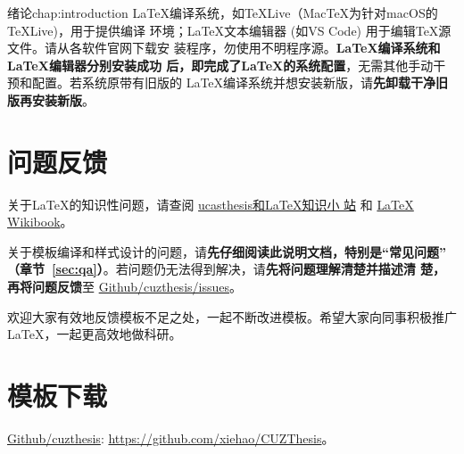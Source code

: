 \begin{cuzchapter}{绪论}{chap:introduction}
\LaTeX{}编译系统，如\TeX{}Live（Mac\TeX{}为针对macOS的\TeX{}Live)，用于提供编译
环境；\LaTeX{}文本编辑器 (如VS Code) 用于编辑\TeX{}源文件。请从各软件官网下载安
装程序，勿使用不明程序源。\textbf{\LaTeX{}编译系统和\LaTeX{}编辑器分别安装成功
后，即完成了\LaTeX{}的系统配置}，无需其他手动干预和配置。若系统原带有旧版的
\LaTeX{}编译系统并想安装新版，请\textbf{先卸载干净旧版再安装新版}。

\section{问题反馈}\label{sec:callback}

关于\LaTeX{}的知识性问题，请查阅
\href{https://github.com/mohuangrui/ucasthesis/wiki}{ucasthesis和\LaTeX{}知识小
站} 和 \href{https://en.wikibooks.org/wiki/LaTeX}{\LaTeX{} Wikibook}。

关于模板编译和样式设计的问题，请\textbf{先仔细阅读此说明文档，特别是“常见问题”
（章节~\ref{sec:qa}）}。若问题仍无法得到解决，请\textbf{先将问题理解清楚并描述清
楚，再将问题反馈}至
\href{https://github.com/xiehao/CUZThesis/issues}{Github/cuzthesis/issues}。

欢迎大家有效地反馈模板不足之处，一起不断改进模板。希望大家向同事积极推广
\LaTeX{}，一起更高效地做科研。

\section{模板下载}\label{sec:download}

\begin{center}
    \href{https://github.com/xiehao/CUZThesis}{Github/cuzthesis}:
    \url{https://github.com/xiehao/CUZThesis}。
\end{center}

\end{cuzchapter}